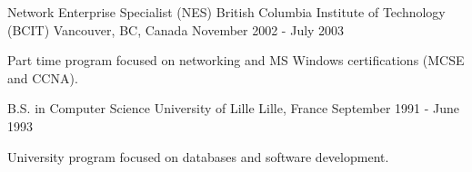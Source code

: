 

\begin{cventries}


\cventry
    {Network Enterprise Specialist (NES)} %
    {British Columbia Institute of Technology (BCIT)} %
    {Vancouver, BC, Canada} %
    {November 2002 - July 2003} %
    {
      \begin{cvitems} %
        \item {Part time program focused on networking and MS Windows certifications (MCSE and CCNA).}
      \end{cvitems}
    }

\cventry
    {B.S. in Computer Science} %
    {University of Lille} %
    {Lille, France} %
    {September 1991 - June 1993} %
    {
      \begin{cvitems} %
        \item {University program focused on databases and software development.}
      \end{cvitems}
    }



\end{cventries}
